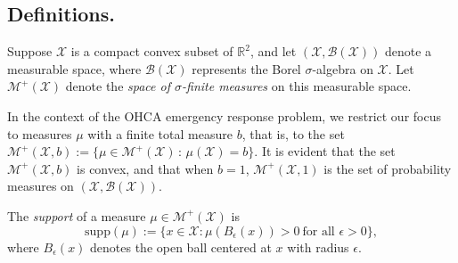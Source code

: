 \documentclass[stsy,sglanonrev]{informs4}
\begin{document}
\subsection{Definitions.}\label{sec:def} Suppose $\mathcal{X}$ is a compact convex subset of $\mathbb{R}^2$, and let $(\mathcal{X},\mathcal{B}(\mathcal{X}))$ denote a measurable space, where $\mathcal{B}(\mathcal{X})$ represents the Borel $\sigma$-algebra on $\mathcal{X}$. %
 Let $\mathcal{M}^+(\mathcal{X})$ denote the \emph{space of $\sigma$-finite measures} on this measurable space.
\begin{definition} In the context of the OHCA emergency response problem, we restrict our focus to measures $\mu$ with a finite total measure $b$, that is, to the set $\mathcal{M}^+(\mathcal{X},b) := \{\mu \in \mathcal{M}^+(\mathcal{X})\, : \, \mu(\mathcal{X})=b\}$.
It is evident that the set $\mathcal{M}^+(\mathcal{X},b)$ is convex, and that  when $b=1$, $\mathcal{M}^+(\mathcal{X},1)$ is the set of probability measures on $(\mathcal{X},\mathcal{B}(\mathcal{X}))$.
\end{definition}
\begin{definition}[Support] The \emph{support} of a measure $\mu \in \mathcal{M}^+(\mathcal{X})$ is \begin{equation}\label{suppdef} \mathrm{supp}(\mu) := \{ x \in \mathcal{X} : \mu(B_\epsilon(x)) > 0\ \text{for all } \epsilon > 0 \},
\end{equation} where \( B_\epsilon(x) \) denotes the open ball centered at \( x \) with radius \( \epsilon \). \end{definition}
\end{document}
